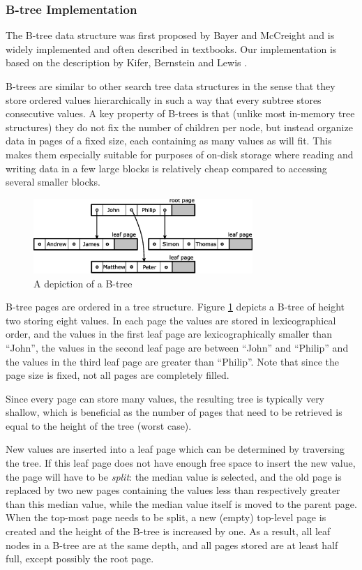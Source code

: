 \documentclass{acm_proc_article-sp}
\begin{document}
\subsubsection{B-tree Implementation}
The B-tree data structure was first proposed by Bayer and McCreight
\cite{bayer1970oam} and is widely implemented and often described in
textbooks. Our implementation is based on the description by Kifer, Bernstein
and Lewis \cite{kifer2006dsa}.

B-trees are similar to other search tree data structures in the sense that
they store ordered values hierarchically in such a way that every subtree stores
consecutive values.
A key property of B-trees is that (unlike most in-memory tree structures) they
do not fix the number of children per node, but instead organize data in pages
of a fixed size, each containing as many values as will fit.
This makes them especially suitable for purposes of on-disk storage where
reading and writing data in a few large blocks is relatively cheap compared to
accessing several smaller blocks.

\begin{figure}[b]
\centering
\includegraphics[width=83mm]{b-tree}
\caption{A depiction of a B-tree}
\label{fig-b-tree}
\end{figure}

B-tree pages are ordered in a tree structure. Figure \ref{fig-b-tree} depicts a
B-tree of height two storing eight values.
In each page the values are stored in lexicographical order, and the values
in the first leaf page are lexicographically smaller than ``John'', the values
in the second leaf page are between ``John'' and ``Philip'' and the values in
the third leaf page are greater than ``Philip''. Note that since the page
size is fixed, not all pages are completely filled.

Since every page can store many values, the resulting tree is typically very
shallow, which is beneficial as the number of pages that need to be retrieved
is equal to the height of the tree (worst case).

New values are inserted into a leaf page which can be determined by traversing
the tree.
If this leaf page does not have enough free space to insert the new value,
the page will have to be \emph{split}: the median value is selected, and the old
page is replaced by two new pages containing the values less than respectively
greater than this median value, while the median value itself is moved to the
parent page.
When the top-most page needs to be split, a new (empty) top-level page is
created and the height of the B-tree is increased by one. As a result, all leaf
nodes in a B-tree are at the same depth, and all pages stored are at least half
full, except possibly the root page.
\end{document}
